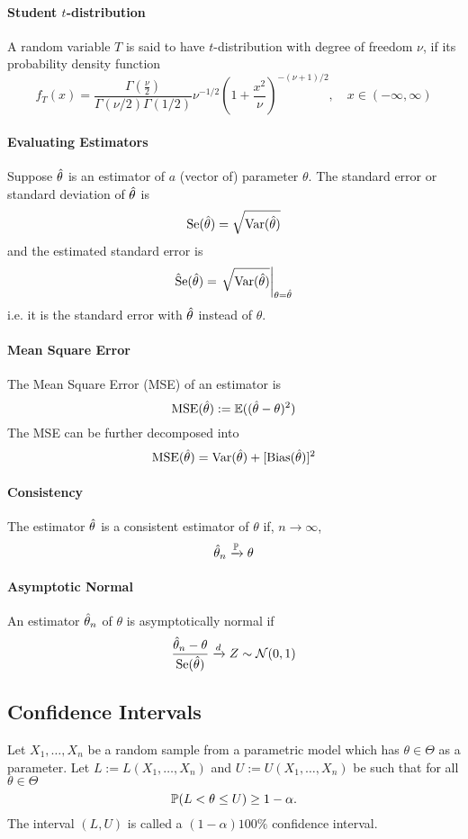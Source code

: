\paragraph{Student \(t\)-distribution}
A random variable \(T\) is said to have \(t\)-distribution with degree of freedom \(\nu\), if its probability density function
\[f_T(x) = \frac{\Gamma(\frac{\nu}{2})}{\Gamma(\nu / 2)\Gamma(1 / 2)}\nu^{-1/2}\left(1 + \frac{x^2}{\nu}\right)^{-(\nu+1)/2}, \quad x\in (-\infty, \infty)\]

\paragraph{Evaluating Estimators}
Suppose \(\hat{\theta}\) is an estimator of \(a\) (vector of) parameter \(\theta\). The standard error or standard deviation of \(\hat{\theta}\) is
\[\mathrm{Se}(\hat{\theta}) = \sqrt{\mathrm{Var}(\hat{\theta})}\]
and the estimated standard error is
\[\hat{\mathrm{S}}\mathrm{e}(\hat{\theta}) = \left. \sqrt{\mathrm{Var}(\hat{\theta})} \right|_{\theta = \hat{\theta}}\]
i.e. it is the standard error with \(\hat{\theta}\) instead of \(\theta\).

\paragraph{Mean Square Error}
The Mean Square Error (MSE) of an estimator is
\[\mathrm{MSE}(\hat{\theta}) := \mathbb{E}((\hat{\theta} - \theta)^2)\]
The MSE can be further decomposed into 
\[\mathrm{MSE}(\hat{\theta}) = \mathrm{Var}(\hat{\theta}) + [\mathrm{Bias}(\hat{\theta})]^2\]

\paragraph{Consistency}
The estimator \(\hat{\theta}\) is a consistent estimator of \(\theta\) if, \(n \to \infty\),
\[\hat{\theta}_n \xrightarrow{\mathbb{P}} \theta\]

\paragraph{Asymptotic Normal}
An estimator \(\hat{\theta}_n\) of \(\theta\) is asymptotically normal if
\[\frac{\hat{\theta}_n - \theta}{\mathrm{Se}(\hat{\theta})} \xrightarrow{d} Z \sim \mathcal{N}(0,1)\]

\subsection{Confidence Intervals}
Let \(X_1, \dots, X_n\) be a random sample from a parametric model which has \(\theta \in \Theta\) as a parameter. Let \(L := L(X_1, \dots, X_n)\) and \(U := U(X_1, \dots, X_n)\) be such that for all \(\theta \in \Theta\)
\[\mathbb{P}(L < \theta \leq U) \geq 1 - \alpha.\]
The interval \((L,U)\) is called a \((1 - \alpha)100\%\) confidence interval.

